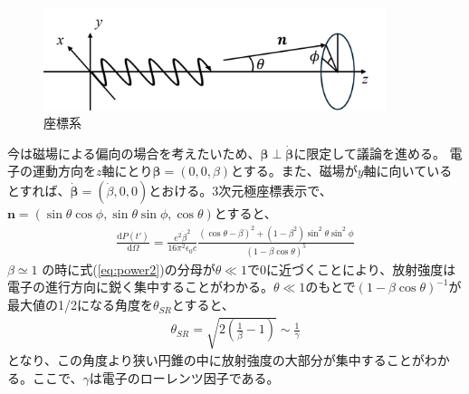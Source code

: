 \documentclass[a4paper,11pt,uplatex]{jsbook}
\begin{document}
\begin{figure}[htbp]
  \centering
  \includegraphics[width=10cm]{image/2-cordinate.png}
  \caption{座標系}
\end{figure}
今は磁場による偏向の場合を考えたいため、$\bm{\beta} \perp \bm{\dot{\beta}}$に限定して議論を進める。
電子の運動方向を$z$軸にとり$\bm{\beta} = (0,0,\beta)$とする。また、磁場が$y$軸に向いているとすれば、$\bm{\dot{\beta}} = (\dot{\beta},0,0)$とおける。3次元極座標表示で、$\bm{n} = (\sin\theta\cos\phi,\sin\theta\sin\phi,\cos\theta)$とすると、
\begin{eqnarray}\label{eq:power2}
  \frac{\text{d}P(t')}{\text{d}\Omega} = \frac{e^2\dot{\beta}^2}{16\pi^2 \epsilon_0 c}\frac{(\cos\theta - \beta)^2 + (1-\beta^2)\sin^2\theta\sin^2\phi}{(1-\beta \cos\theta)^5}
\end{eqnarray}
$\beta \simeq 1$ の時に式(\ref{eq:power2})の分母が$\theta \ll 1$で0に近づくことにより、放射強度は電子の進行方向に鋭く集中することがわかる。$\theta \ll 1$のもとで$(1-\beta\cos\theta)^{-1}$が最大値の1/2になる角度を$\theta_{SR}$とすると、
\begin{eqnarray}
  \theta_{SR} = \sqrt{2\left(\frac{1}{\beta} -1\right)} \sim \frac{1}{\gamma}
\end{eqnarray}
となり、この角度より狭い円錐の中に放射強度の大部分が集中することがわかる。ここで、$\gamma$は電子のローレンツ因子である。
\end{document}
